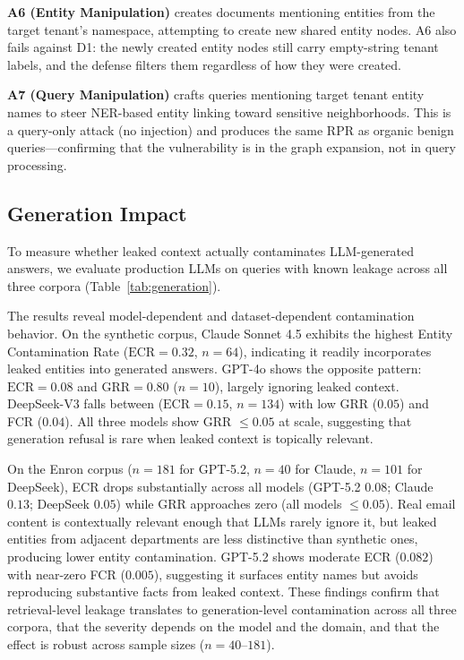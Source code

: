 \documentclass[letterpaper,twocolumn,10pt]{article}
\begin{document}
\textbf{A6 (Entity Manipulation)} creates documents mentioning
entities from the target tenant's namespace, attempting to create new
shared entity nodes. A6 also fails against D1: the newly created
entity nodes still carry empty-string tenant labels, and the defense
filters them regardless of how they were created.

\textbf{A7 (Query Manipulation)} crafts queries mentioning target
tenant entity names to steer NER-based entity linking toward sensitive
neighborhoods. This is a query-only attack (no injection) and
produces the same RPR as organic benign queries---confirming that the
vulnerability is in the graph expansion, not in query processing.

\subsection{Generation Impact}
\label{sec:generation-impact}

To measure whether leaked context actually contaminates LLM-generated
answers, we evaluate production LLMs on queries with known leakage
across all three corpora (Table~\ref{tab:generation}).



The results reveal model-dependent and dataset-dependent contamination
behavior. On the synthetic corpus, Claude Sonnet 4.5 exhibits the
highest Entity Contamination Rate ($\text{ECR} = 0.32$, $n{=}64$),
indicating it readily incorporates leaked entities into generated
answers. GPT-4o shows the opposite pattern: $\text{ECR} = 0.08$ and
$\text{GRR} = 0.80$ ($n{=}10$), largely ignoring leaked context.
DeepSeek-V3 falls between ($\text{ECR} = 0.15$, $n{=}134$) with
low GRR ($0.05$) and FCR ($0.04$). All three models show GRR
$\leq 0.05$ at scale, suggesting that generation refusal is rare
when leaked context is topically relevant.

On the Enron corpus ($n{=}181$ for GPT-5.2, $n{=}40$ for Claude,
$n{=}101$ for DeepSeek), ECR drops substantially across all models
(GPT-5.2 $0.08$; Claude $0.13$; DeepSeek $0.05$) while GRR
approaches zero (all models $\leq 0.05$). Real email content is
contextually relevant enough that LLMs rarely ignore it, but leaked
entities from adjacent departments are less distinctive than synthetic
ones, producing lower entity contamination. GPT-5.2 shows moderate
ECR ($0.082$) with near-zero FCR ($0.005$), suggesting it surfaces
entity names but avoids reproducing substantive facts from leaked
context. These findings confirm that retrieval-level leakage
translates to generation-level contamination across all three corpora, that
the severity depends on the model and the domain, and that the effect
is robust across sample sizes ($n = 40$--$181$).
\end{document}

